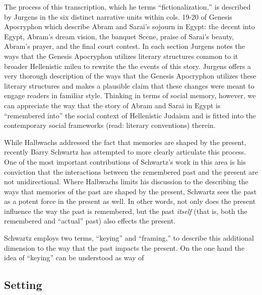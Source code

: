 The process of this transcription, which he terms ``fictionalization,''
is described by Jurgens in the six distinct narrative units within cols.
19-20 of Genesis Apocryphon which describe Abram and Sarai's sojourn in
Egypt: the decent into Egypt, Abram's dream vision, the banquet Scene,
praise of Sarai's beauty, Abram's prayer, and the final court contest.
In each section Jurgens notes the ways that the Genesis Apocryphon
utilizes literary structures common to it broader Hellenistic mileu to
rewrite the the events of this story. Jurgens offers a very thorough
description of the ways that the Genesis Apocryphon utilizes these
literary structures and makes a plausible claim that these changes were
meant to engage readers in familiar style. Thinking in terms of social
memory, however, we can appreciate the way that the story of Abram and
Sarai in Egypt is ``remembered into'' the social context of Hellenistic
Judaism and is fitted into the contemporary social frameworks (read:
literary conventions) therein.

While Halbwachs addressed the fact that memories are shaped by the
present, recently Barry Schwartz has attempted to more clearly
articulate this process. One of the most important contributions of
Schwartz's work in this area is his conviction that the interactions
between the remembered past and the present are not unidirectional.
Where Halbwachs limits his discussion to the describing the ways that
memories of the past are shaped by the present, Schwartz sees the past
as a potent force in the present as well. In other words, not only does
the present influence the way the past is remembered, but the past
\emph{itself} (that is, both the remembered and ``actual'' past) also
effects the present.

Schwartz employs two terms, ``keying'' and ``framing,'' to describe this
additional dimension to the way that the past impacts the present. On
the one hand the idea of ``keying'' can be understood as way of

\hypertarget{setting}{%
\subsection{Setting}\label{setting}}

